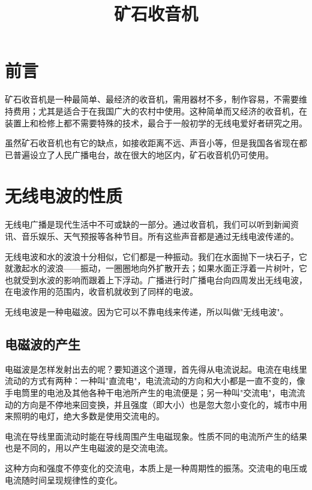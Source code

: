 \documentclass[12pt,UTF8]{ctexbook}
\title{\heiti\zihao{0} 矿石收音机}
\author{}
\date{}
\begin{document}
\maketitle
\tableofcontents

\frontmatter
\chapter{前言}

矿石收音机是一种最简单、最经济的收音机，需用器材不多，制作容易，不需要维持费用；尤其是适合于在我国广大的农村中使用。这种简单而又经济的收音机，在装置上和检修上都不需要特殊的技术，最合于一般初学的无线电爱好者研究之用。

虽然矿石收音机也有它的缺点，如接收距离不远、声音小等，但是我国各省现在都已普遍设立了人民广播电台，故在很大的地区内，矿石收音机仍可使用。

\mainmatter

\chapter{无线电波的性质}

无线电广播是现代生活中不可或缺的一部分。通过收音机，我们可以听到新闻资讯、音乐娱乐、天气预报等各种节目。所有这些声音都是通过无线电波传递的。

无线电波和水的波浪十分相似，它们都是一种振动。我们在水面抛下一块石子，它就激起水的波浪——振动，一圈圈地向外扩散开去；如果水面正浮着一片树叶，它也就受到水波的影响而跟着上下浮动。广播进行时广播电台向四周发出无线电波，在电波作用的范围内，收音机就收到了同样的电波。

无线电波是一种电磁波。因为它可以不靠电线来传递，所以叫做"无线电波"。

\section{电磁波的产生}

电磁波是怎样发射出去的呢？要知道这个道理，首先得从电流说起。电流在电线里流动的方式有两种：一种叫"直流电"，电流流动的方向和大小都是一直不变的，像手电筒里的电池及其他各种干电池所产生的电流便是；另一种叫"交流电"，电流流动的方向是不停地来回变换，并且强度（即大小）也是忽大忽小变化的，城市中用来照明的电灯，绝大多数是使用交流电的。

电流在导线里面流动时能在导线周围产生电磁现象。性质不同的电流所产生的结果也是不同的，用以产生电磁波的是交流电流。

这种方向和强度不停变化的交流电，本质上是一种周期性的振荡。交流电的电压或电流随时间呈现规律性的变化。
\end{document}
